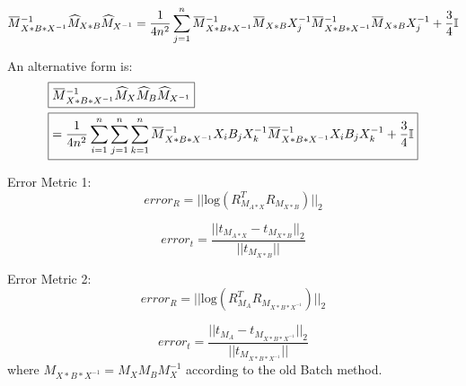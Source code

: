 \documentclass[twocolumn,10pt]{asme2ej}
\newcommand{\II}{\mathbb{I}}
\newcommand{\overbar}[1]{\mkern 1.5mu\overline{\mkern-1.5mu#1\mkern-1.5mu}\mkern 1.5mu}
\begin{document}
\begin{equation}
\overbar{M}_{X*B*X^{-1}}^{-1}\widehat{M}_{X*B}\widehat{M}_{X^{-1}} = \dfrac{1}{4n^2} \sum_{j=1}^n \overbar{M}_{X*B*X^{-1}}^{-1} \overbar{M}_{X*B} X_j^{-1} \overbar{M}_{X*B*X^{-1}}^{-1} \overbar{M}_{X*B} X_j^{-1}  + \dfrac{3}{4}\II
\label{2ndXBX}
\end{equation}

An alternative form is:
\begin{equation}
\begin{split}
& \boxed{\overbar{M}_{X*B*X^{-1}}^{-1}\widehat{M}_{X}\widehat{M}_{B}
\widehat{M}_{X^{-1}}} \\ 
& \boxed{= \dfrac{1}{4n^2} \sum_{i=1}^n \sum_{j=1}^n \sum_{k=1}^n  \overbar{M}_{X*B*X^{-1}}^{-1} X_{i} B_{j} X_k^{-1} \overbar{M}_{X*B*X^{-1}}^{-1} X_{i} B_{j} X_k^{-1}  + \dfrac{3}{4}\II}
\end{split}
\end{equation}

Error Metric 1:
\begin{equation}
error_R = ||\text{log}(R_{M_{A*X}}^{T} R_{M_{X*B}})||_2
\end{equation}

\begin{equation}
error_t = \dfrac{||t_{M_{A*X}} - t_{M_{X*B}}||_2}{||t_{M_{X*B}}||}
\end{equation}

Error Metric 2:
\begin{equation}
error_R = ||\text{log}(R_{M_{A}}^{T} R_{M_{X*B*X^{-1}}})||_2
\end{equation}

\begin{equation}
error_t = \dfrac{||t_{M_A} - t_{M_{X*B*X^{-1}}}||_2}{||t_{M_{X*B*X^{-1}}}||}
\end{equation}
where $M_{X*B*X^{-1}} = M_X M_B M_X^{-1}$ according to the old Batch method.
\end{document}
